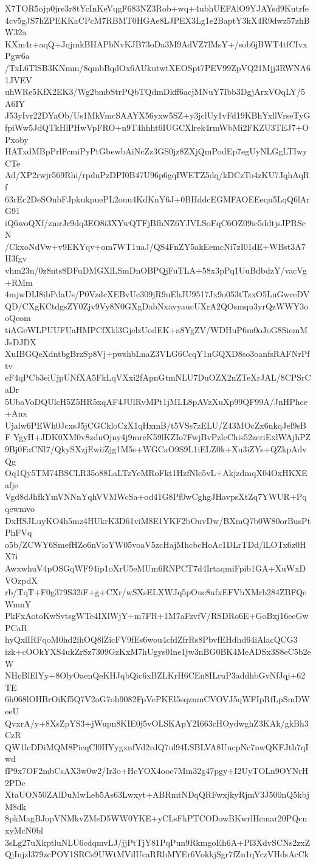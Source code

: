 X7TOR5ojp0jre3r8tYcInKeVqgF683NZ3Rob+wq+4ubhUEFAlO9YJAYsd9Kutrfe
4cv5gJS7hZPEKKaCPcM7RBMT0HGAe8LJPEX3Lg1e2BaptY3kX4R9dwz57zhBW32a
KXm4r+aqQ+JqjmkBHAPbNvKJB73oDa3M9AdVZ7lMsY+/sob6jBWT4tfCIvxPgw6a
/TxL6TlSB3KNmm/8qmbBqdOx6AUkutwtXEOSpt7PEV99ZpVQ21Mjj3RWNA61JVEV
uhWRe5KfX2EK3/Wg2bmbStrPQbTQdmDkff6acjMNuY7Ibb3DgjArxVOqLY/5A6IY
J53yIvr22DYaOb/Us1MkVmcSAAYX56yxw5SZ+y3jclUy1vFd19KBhYxllVrseTyG
fpiWw5JdQTkHlPHwVpFRO+n9T4hhht6IUGCXlrek4rmWbMi2FKZU3TEJ7+OPxoby
HATxdMBpPrlFcmiPyPtGbewbAiNcZz3GS0jz8ZXjQmPodEp7egUyNLGgLTIwyCTe
Ad/XP2rwjr569Rhi/rpduPzDPI0B47U96p6gqIWETZ5dq/kDCzTo4zKU7JqhAqRf
63rEc2DeSOnbFJpkukpuePL2ouu4KdKnY6J+0BHddcEGMFAOEEequ5LqQ6lArG91
iQ6woQXf/zmrJr9dq3EO8i3XYwQTFjBfhNZ6YJVLSoFqC6OZ09ic5ddtjsJPRScN
/CkxoNdVw+v9EKYqv+om7WT1uaJ/QS4FnZY5akEemcNi7zI01dE+WBst3A7H3fgv
vhm23n/0z8nts8DFuDMGXlLSmDnOBPQjFuTLA+58x3pPq1UuBdbdzY/vacVg+RMm
4mjwDIJ8ibPdaUs/P0VzdcXEBvUc309jR9uEhJU9517Jx9o053tTzxO5LuGwreDV
QD/CXgKCtdgsZY0Zjv9Vy8N0GXgDabNxavyaucUXrA2QOsmqu3yrQzWWY3ooQcom
tiAGeWLPUUFUaHMPCfXkl3GjelzUodEK+a8YgZV/WDHuP6m0oJoG8SiemMJsDJDX
XuIBGQeXdntbgBrzSp8Vj+pwshbLnaZ3VLG6CcqY1nGQXD8so3oanfsRAFNrPftv
eF4qPCb3eiUjpUNfXA5FkLqVXxi2fApnGtmNLU7DuOZX2nZTeXrJAL/8CPSrCaDr
5UbaVoDQUlcH5Z5HR5xqAF4JUlRvMPt1jMLL8pAVzXuXp99QF99A/JnHPhce+Anx
Ujalw6PEWh0JcxsJ5jCGCkloCzX1qHxmB/t5VSs7zELU/Z43MOcZx6nkqJel9sBF
YgyH+JDK0XM0v8zduOjny4j9mreK59lKZIo7FwjBvPzleChis52zeriExlWAjhPZ
9Bj0FaCNl7/QkySXzjEwiiZjg1M5s+WGCaO9S9L1iELZ0k+Xu3iZYs+QZkpAdvQg
Oq1Qy5TM74BSCLR35o88LaLTzYeMRoFkt1HzfNlc5vL+AkjzdmqX04OxHKXEafje
Vgd8dJhfkYmVNNnYqhVVMWcSa+od41G8Pf0wCghgJHavpsXtZq7YWUR+Pqqewmvo
DxHSJLuyKO4h5mz4HUkrK3D61viM8E1YKF2bOuvDw/BXmQ7b0W80orBusPtPhFVq
o5b/ZCWY6SmefHZo6nVioYW05voaV5zcHajMhcbcHoAc1DLrTDd/lLOTx6z0HX7i
AwxwhuV4pOSGqWF94ip1oXrU5eMUm6RNPCT7d4IrtaqmiFpib1GA+XuWxDVOzpdX
rb/TqT+F0g379S32iF+g+CXr/wSXsELXWJq5pOuc8ufxEFVhXMrb284ZBFQeWmnY
PkFxAotoKwSvtsgWTe4IXlWjY+m7FR+1M7aFzvfV/RSDRo6E+GoBxj16eeGwPCaR
hyQxlIRFqoM0hd2ihOQ8lZicFV9fEs6wou4cfdZfrRs8PbvfEHdhd64iAlacQCG3
izk+cOOkYXS4ukZrSz7309GzKxM7hUgys0Ine1jw3nBG0BK4MeADSx3S8eC5b2eW
NHcBlElYy+8OlyOaenQeKHJqbQic6xBZLKrH6CEn8ILruP3addhbGvNfJqj+62TE
6h068lOHBrOiKf5Q7V2oG7oh9082FpVePKEl5sqznmCVOVJ5qWFIpRfLpSmDWeeU
QvxrA/y+8XsZpYS3+jWupn8KIE0j5vOLSKApY2I663cHOydwghZ3KAk/gkBh3CzR
QW1lcDDiMQM8PicqCl0HYygxnfVd2rdQ7ul94LSBLVA8UucpNc7nwQKFJth7qIwd
fP9x7OF2mbCsAX3w0w2/Ir3o+HcYOX4ooe7Mm32g47pgy+I2UyTOLn9OYNrH2PDc
XtaUON50ZAlDuMwLeb5As63Lwxyt+ABRmtNDqQRFwxjkyRjmV3J500nQ5kbjM8dk
8pkMagBJopVNMkvZMsD5WW0YKE+yCLsFkPTCODowBKwrlHcmar20PQcnxyMcN0bl
3sLg27uXkptluNLU6cdqmvLJ/jjPtTjY81PqPun9RkmgoEh6A+Pl3XdvSCNs2zxZ
QjInjzl379zcPOY1SRCs9UWtMVilUcaRRhMYEr6VokkjSgr7fZn1qYczVHdsAcCk
